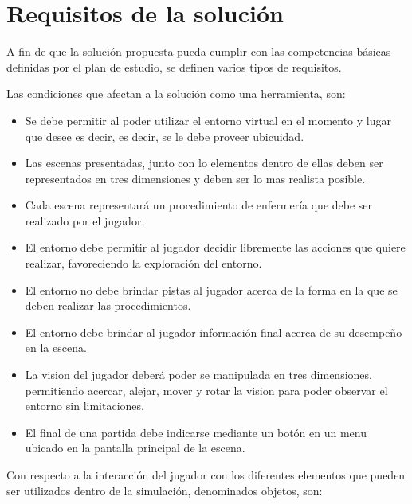 \section{Requisitos de la solución}
\label{sec:problema_requisitos}

A fin de que la solución propuesta pueda cumplir con las competencias básicas
definidas por el plan de estudio, se definen varios tipos de requisitos.

Las condiciones que afectan a la solución como una herramienta, son:

\begin{itemize}
    \item Se debe permitir al  poder utilizar el entorno virtual en el
    momento y lugar que desee es decir, es decir, se le debe proveer ubicuidad.
\item Las escenas presentadas, junto con lo elementos dentro de ellas deben ser
    representados en tres dimensiones y deben ser lo mas realista
    posible.
\item Cada escena representará un procedimiento de enfermería que debe ser
    realizado por el jugador.
\item El entorno debe permitir al jugador decidir libremente las acciones que
    quiere realizar, favoreciendo la exploración del entorno.
\item El entorno no debe brindar pistas al jugador acerca de la forma en la que
    se deben realizar las procedimientos.
\item El entorno debe brindar al jugador información final acerca de su
    desempeño en la escena.
\item La vision del jugador deberá poder se manipulada en tres dimensiones,
    permitiendo acercar, alejar, mover y rotar la vision para poder observar el
    entorno sin limitaciones.
\item El final de una partida debe indicarse mediante un botón en un menu
    ubicado en la pantalla principal de la escena.
\end{itemize}


Con respecto a la interacción del jugador con los diferentes elementos que
pueden ser utilizados dentro de la simulación, denominados objetos, son:

